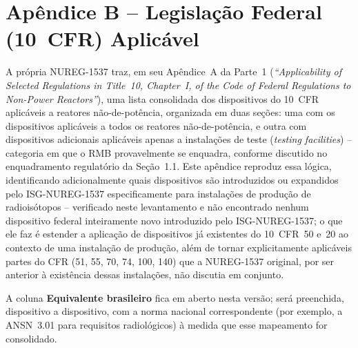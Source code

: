\hypertarget{apB}{}%
\section*{Ap\^endice B -- Legisla\c{c}\~ao Federal (10~CFR) Aplic\'avel}
\label{sec:apendice-b}

A pr\'opria NUREG-1537 traz, em seu Ap\^endice~A da Parte~1
(\emph{``Applicability of Selected Regulations in Title~10, Chapter~I, of
the Code of Federal Regulations to Non-Power Reactors''}), uma lista
consolidada dos dispositivos do 10~CFR aplic\'aveis a reatores
n\~ao-de-pot\^encia, organizada em duas se\c{c}\~oes: uma com os
dispositivos aplic\'aveis a todos os reatores n\~ao-de-pot\^encia, e outra
com dispositivos adicionais aplic\'aveis apenas a instala\c{c}\~oes de
teste (\emph{testing facilities}) -- categoria em que o RMB
provavelmente se enquadra, conforme discutido no enquadramento
regulat\'orio da Se\c{c}\~ao~1.1. Este ap\^endice reproduz essa l\'ogica,
identificando adicionalmente quais dispositivos s\~ao introduzidos ou
expandidos pelo ISG-NUREG-1537 especificamente
para instala\c{c}\~oes de produ\c{c}\~ao de radiois\'otopos -- verificado
neste levantamento e n\~ao encontrado nenhum dispositivo federal
inteiramente novo introduzido pelo ISG-NUREG-1537; o que ele faz \'e estender a
aplica\c{c}\~ao de dispositivos j\'a existentes do 10~CFR~50 e~20 ao
contexto de uma instala\c{c}\~ao de produ\c{c}\~ao, al\'em de tornar
explicitamente aplic\'aveis partes do CFR (51, 55, 70, 74, 100, 140) que a
NUREG-1537 original, por ser anterior \`a exist\^encia dessas
instala\c{c}\~oes, n\~ao discutia em conjunto.

A coluna \textbf{Equivalente brasileiro} fica em aberto nesta vers\~ao;
ser\'a preenchida, dispositivo a dispositivo, com a norma nacional
correspondente (por exemplo, a ANSN~3.01 para requisitos radiol\'ogicos)
\`a medida que esse mapeamento for consolidado.

